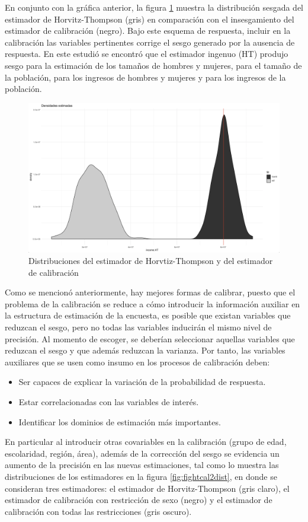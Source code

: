 \documentclass[
  12pt,
]{book}
\providecommand{\tightlist}{%
  \setlength{\itemsep}{0pt}\setlength{\parskip}{0pt}}
\begin{document}
En conjunto con la gráfica anterior, la figura \ref{fig:fightcaldist} muestra la distribución sesgada del estimador de Horvitz-Thompson (gris) en comparación con el insesgamiento del estimador de calibración (negro). Bajo este esquema de respuesta, incluir en la calibración las variables pertinentes corrige el sesgo generado por la ausencia de respuesta. En este estudió se encontró que el estimador ingenuo (HT) produjo sesgo para la estimación de los tamaños de hombres y mujeres, para el tamaño de la población, para los ingresos de hombres y mujeres y para los ingresos de la población.

\begin{figure}

{\centering \includegraphics[width=0.5\linewidth]{Pics/c10} 

}

\caption{Distribuciones del estimador de Horvtiz-Thompson y del estimador de calibración}\label{fig:fightcaldist}
\end{figure}

Como se mencionó anteriormente, hay mejores formas de calibrar, puesto que el problema de la calibración se reduce a cómo introducir la información auxiliar en la estructura de estimación de la encuesta, es posible que existan variables que reduzcan el sesgo, pero no todas las variables inducirán el mismo nivel de precisión. Al momento de escoger, se deberían seleccionar aquellas variables que reduzcan el sesgo y que además reduzcan la varianza. Por tanto, las variables auxiliares que se usen como insumo en los procesos de calibración deben:

\begin{itemize}
\tightlist
\item
  Ser capaces de explicar la variación de la probabilidad de respuesta.
\item
  Estar correlacionadas con las variables de interés.
\item
  Identificar los dominios de estimación más importantes.
\end{itemize}

En particular al introducir otras covariables en la calibración (grupo de edad, escolaridad, región, área), además de la corrección del sesgo se evidencia un aumento de la precisión en las nuevas estimaciones, tal como lo muestra las distribuciones de los estimadores en la figura \ref{fig:fightcal2dist}, en donde se consideran tres estimadores: el estimador de Horvitz-Thompson (gris claro), el estimador de calibración con restricción de sexo (negro) y el estimador de calibración con todas las restricciones (gris oscuro).
\end{document}
